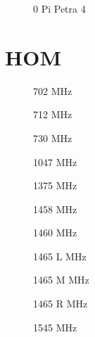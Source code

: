 \begin{figure}[h]
  \centering
  
  \caption{0 Pi Petra 4}
\end{figure}
\FloatBarrier

\section{HOM}
\label{app:hom_felder}
\FloatBarrier

\begin{figure}[h]
  \centering
  
  \caption{702 MHz}
\end{figure}

\begin{figure}[h]
  \centering
  
  \caption{712 MHz}
\end{figure}

\begin{figure}[h]
  \centering
  
  \caption{730 MHz}
\end{figure}

\begin{figure}[h]
  \centering
  
  \caption{1047 MHz}
\end{figure}

\begin{figure}[h]
  \centering
  
  \caption{1375 MHz}
\end{figure}

\begin{figure}[h]
  \centering
  
  \caption{1458 MHz}
\end{figure}

\begin{figure}[h]
  \centering
  
  \caption{1460 MHz}
\end{figure}

\begin{figure}[h]
  \centering
  
  \caption{1465 L MHz}
\end{figure}

\begin{figure}[h]
  \centering
  
  \caption{1465 M MHz}
\end{figure}

\begin{figure}[h]
  \centering
  
  \caption{1465 R MHz}
\end{figure}

\begin{figure}[h]
  \centering
  
  \caption{1545 MHz}
\end{figure}

\FloatBarrier